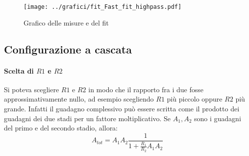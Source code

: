 \documentclass[10pt,a4paper]{article}
\begin{document}
\begin{figure}[h!]
	\centering
	\texttt{[image: ../grafici/fit\_Fast\_fit\_highpass.pdf]}
	\caption{Grafico delle misure e del fit}
\end{figure}
\subsection{Configurazione a cascata}

\paragraph{Scelta di $R1$ e $R2$} Si poteva scegliere $R1$ e $R2$ in modo che il rapporto fra i due fosse approssimativamente nullo, ad esempio scegliendo $R1$ più piccolo oppure $R2$ più grande.
Infatti il guadagno complessivo può essere scritta come il prodotto dei guadagni dei due stadi per un fattore moltiplicativo. Se $A_1, A_2$ sono i guadagni del primo e del secondo stadio, allora:
\begin{equation*}
A_{tot} = A_1 A_2 \frac{1}{1 + \frac{R_1}{R_2} A_1 A_2}
\end{equation*}


\end{document}
